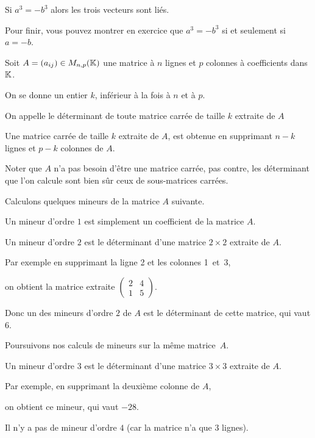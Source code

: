 \change
Si $a^3 = - b^3$ alors les trois vecteurs sont liés.

\change
Pour finir, vous pouvez montrer en exercice que $a^3=-b^3$ si et seulement si $a=-b$.


\diapo
Soit $A=(a_{ij}) \in M_{n,p}(\mathbb{K})$ une matrice à $n$ lignes 
et $p$ colonnes à coefficients dans $\mathbb{K}$. 

\change
On se donne un entier  $k$, inférieur à la fois à $n$ et à $p$.

\change
On appelle  le déterminant de toute matrice carrée de taille $k$ extraite 
de $A$

\change
 Une matrice carrée de taille $k$ extraite de $A$, est obtenue en supprimant $n-k$ lignes 
 et $p-k$ colonnes de $A$.

\change
Noter que $A$ n'a pas besoin d'être une matrice carrée, pas contre, les déterminant que l'on calcule 
sont bien sûr ceux de sous-matrices carrées.

\diapo
Calculons quelques mineurs de la matrice $A$ suivante.

\change
Un mineur d'ordre $1$ est simplement un coefficient de la matrice $A$.

\change 
Un mineur d'ordre $2$ est le déterminant d'une matrice $2\times 2$ extraite de $A$.

\change
Par exemple en supprimant la ligne 2 et les colonnes 1~et~3, 

\change
on obtient la matrice extraite 
$\begin{pmatrix}2&4\\1&5\end{pmatrix}$.
  
\change  
Donc un des mineurs d'ordre $2$ de $A$ est le déterminant de cette matrice, qui vaut $ 6$.

\diapo
Poursuivons nos calculs de mineurs sur la même matrice~$A$.
  
\change
Un mineur d'ordre $3$ est le déterminant d'une matrice $3\times 3$ extraite de $A$.

\change
Par exemple, en supprimant la deuxième colonne de $A$, 

\change
on obtient ce mineur, qui vaut $-28$.
  
\change
Il n'y a pas de mineur d'ordre $4$ (car la matrice n'a que $3$ lignes).



